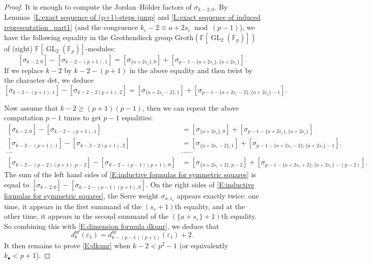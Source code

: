 \documentclass[12pt]{amsart}
\theoremstyle{definition}
\numberwithin{equation}{subsection}
\def\FF{\mathbb{F}}
\DeclareMathOperator{\GL}{GL}
\renewcommand{\det}{\mathrm{det}}
\newcommand{\unr}{\mathrm{ur}}
\begin{document}
\begin{proof}It is enough to compute the Jordan--H\"older factors of $\sigma_{k-2,0}$.
By Lemmas~\ref{L:exact sequence of (p+1)-steps jump} and \ref{L:exact sequence of induced representation_part1} (and the congruence $k_\varepsilon-2 \equiv a+2s_\varepsilon \bmod{(p-1)}$), we have the following equality in the Grothendieck group  $\mathrm{Groth}(\FF[\GL_2(\FF_p)])$ of (right) $\FF[\GL_2(\FF_p)]$-modules:
$$
[\sigma_{k-2,0}]-[\sigma_{k-2-(p+1), 1}]=[\sigma_{\{a+2s_\varepsilon\},0}]+[\sigma_{p-1-\{a+2s_\varepsilon\}, \{a+2s_\varepsilon\}}].
$$
If we replace $k-2$ by $k-2-(p+1)$ in the above equality and then twist by the character $\det$, we deduce 
$$
[\sigma_{k-2-(p+1), 1}]-[\sigma_{k-2-2(p+1), 2}]=[\sigma_{\{a+2s_\varepsilon-2\},1}]+[\sigma_{p-1-\{a+2s_\varepsilon-2\}, \{a+2s_\varepsilon\}-1}].
$$
		
Now assume that $k-2\geq (p+1)(p-1)$, then we can repeat the above		computation $p-1$ times to get $p-1$ equalities:
\begin{align}
\label{E:inductive formulas for symmetric squares}
[\sigma_{k-2,0}]-[\sigma_{k-2-(p+1), 1}]&=[\sigma_{\{a+2s_\varepsilon\},0}]+[\sigma_{p-1-\{a+2s_\varepsilon\}, \{a+2s_\varepsilon\}}]
\\
\nonumber
[\sigma_{k-2-(p+1), 1}]-[\sigma_{k-2-2(p+1), 2}] &=[\sigma_{\{a+2s_\varepsilon-2\},1}]+[\sigma_{p-1-\{a+2s_\varepsilon-2\}, \{a+2s_\varepsilon\}-1}].
\\
\nonumber
\cdots & \cdots\cdots\\
\nonumber
[\sigma_{k-2-(p-2)(p+1), p-2}]-[\sigma_{k-2-(p-1)(p+1), 0}]&=[\sigma_{\{a+2s_\varepsilon+2\},p-2}]+[\sigma_{p-1-\{a+2s_\varepsilon+2\}, \{a+2s_\varepsilon\}-(p-2)}].
\end{align}
The sum of the left hand sides of \eqref{E:inductive formulas for symmetric squares} is equal to $[\sigma_{k-2,0}] - [\sigma_{k-2-(p-1)(p+1), 0}]$.
On the right sides of \eqref{E:inductive formulas for symmetric squares}, the Serre weight $\sigma_{a, s_\varepsilon}$ appears exactly twice: one time, it appears in the first summand of the $(s_\varepsilon+1)$th equality, and at the other time, it appears in the second summand of the $(\{a+s_\varepsilon\}+1)$th equality. So combining this with \eqref{E:dimension formula dkunr}, we deduce that $$d_k^{\unr}(\varepsilon_1)=d_{k-(p-1)(p+1)}^{\unr}(\varepsilon_1)+2.$$
It then remains to prove \eqref{E:dkunr} when $k-2< p^2-1$ (or equivalently $k_\bullet < p+1$).


\end{proof}
\end{document}
